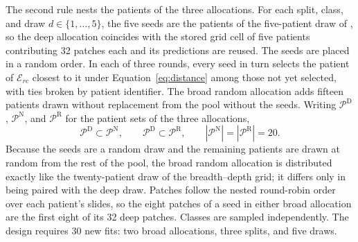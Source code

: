 \documentclass[11pt]{article}
\begin{document}
The second rule nests the patients of the three allocations. For each split, class, and draw $d\in\{1,\ldots,5\}$, the five seeds are the patients of the five-patient draw of \citet{queisler2026effectiveSupport}, so the deep allocation coincides with the stored grid cell of five patients contributing 32 patches each and its predictions are reused. The seeds are placed in a random order. In each of three rounds, every seed in turn selects the patient of $\mathcal E_{rc}$ closest to it under Equation~\eqref{eq:distance} among those not yet selected, with ties broken by patient identifier. The broad random allocation adds fifteen patients drawn without replacement from the pool without the seeds. Writing $\mathcal P^{\mathrm D}$, $\mathcal P^{\mathrm N}$, and $\mathcal P^{\mathrm R}$ for the patient sets of the three allocations,
\begin{equation}
 \mathcal P^{\mathrm D}\subset\mathcal P^{\mathrm N},
 \qquad
 \mathcal P^{\mathrm D}\subset\mathcal P^{\mathrm R},
 \qquad
 |\mathcal P^{\mathrm N}|=|\mathcal P^{\mathrm R}|=20.
 \label{eq:nesting}
\end{equation}
\noindent Because the seeds are a random draw and the remaining patients are drawn at random from the rest of the pool, the broad random allocation is distributed exactly like the twenty-patient draw of the breadth--depth grid; it differs only in being paired with the deep draw. Patches follow the nested round-robin order over each patient's slides, so the eight patches of a seed in either broad allocation are the first eight of its 32 deep patches. Classes are sampled independently. The design requires 30 new fits: two broad allocations, three splits, and five draws.
\end{document}
